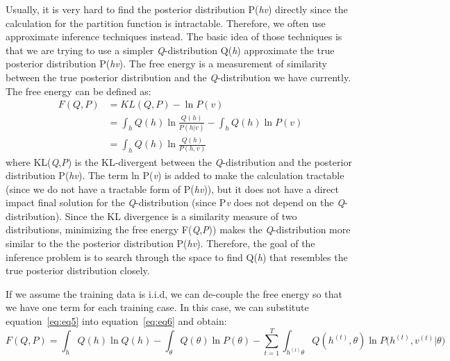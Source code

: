 \documentclass{article} %
\begin{document}
Usually, it is very hard to find the posterior distribution P(\textit{h}\textbar\textit{v}) directly since the calculation for the partition function is intractable. Therefore, we often use approximate inference techniques instead. The basic idea of those techniques is that we are trying to use a simpler \textit{Q}-distribution Q(\textit{h}) approximate the true posterior distribution P(\textit{h}\textbar\textit{v}). The free energy is a measurement of similarity between the true posterior distribution and the \textit{Q}-distribution we have currently. The free energy can be defined as:
\begin{equation} \label{eq:eq6}
\begin{split}
F(Q,P) &= KL(Q,P) - \ln P(v) \\
& = \int_{h} Q(h)\ln \frac{Q(h)}{P(h|v)} - \int_{h} Q(h)\ln P(v) \\
& = \int_{h} Q(h)\ln \frac{Q(h)}{P(h,v)} 
\end{split}
\end{equation}
where KL(\textit{Q},\textit{P}) is the KL-divergent between the \textit{Q}-distribution and the posterior distribution P(\textit{h}\textbar\textit{v}). The term ln P(\textit{v}) is added to make the calculation tractable (since we do not have a tractable form of P(\textit{h}\textbar\textit{v})), but it does not have a direct impact final solution for the \textit{Q}-distribution (since P\textit{v} does not depend on the \textit{Q}-distribution). Since the KL divergence is a similarity measure of two distributions, minimizing the free energy F(\textit{Q},\textit{P})) makes the \textit{Q}-distribution more similar to the the posterior distribution P(\textit{h}\textbar\textit{v}). Therefore, the goal of the inference problem is to search through the space to find Q(\textit{h}) that resembles the true posterior distribution closely. 

If we assume the training data is i.i.d, we can de-couple the free energy so that we have one term for each training case. In this case, we can substitute equation~\ref{eq:eq5} into equation~\ref{eq:eq6} and obtain:
\begin{equation}
F(Q,P) = \int_{h} Q(h)\ln Q(h) - \int_{\theta} Q(\theta)\ln P(\theta) - \sum_{t=1}^T \int_{h^{(t)}\theta}Q(h^{(t)},\theta)\ln P\Big(h^{(t)}, v^{(t)}|\theta\Big) 
\label{eq:eq7}
\end{equation}
\end{document}
